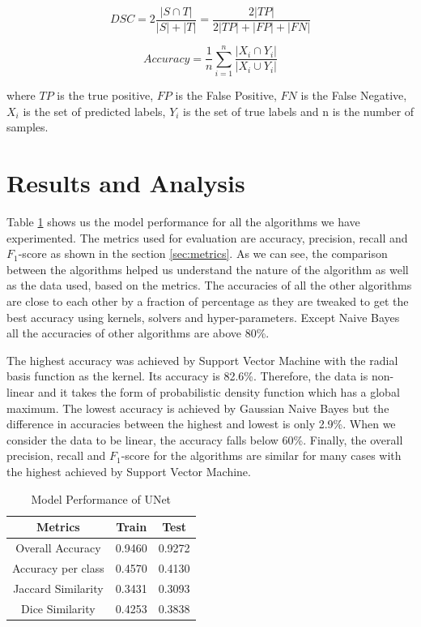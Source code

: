 \documentclass[conference]{IEEEtran}
\begin{document}
\begin{equation}
DSC = 2\frac{|S \cap T|}{|S| + |T|} = \frac{2|TP|}{2|TP| + |FP| + |FN|}
\end{equation}

\begin{equation}
Accuracy = \frac{1}{n}\sum\limits_{i=1}^{n} \frac{|X_i \cap Y_i|}{|X_i \cup Y_i|}
\end{equation}

where $TP$ is the true positive, $FP$ is the False Positive, $FN$ is the False Negative, $X_i$ is the set of predicted labels, $Y_i$ is the set of true labels and n is the number of samples.

\section{Results and Analysis}
Table \ref{table:1} shows us the model performance for all the algorithms we have experimented. The metrics used for evaluation are accuracy, precision, recall and $F_1$-score as shown in the section \ref{sec:metrics}. As we can see, the comparison between the algorithms helped us understand the nature of the algorithm as well as the data used, based on the metrics. The accuracies of all the other algorithms are close to each other by a fraction of percentage as they are tweaked to get the best accuracy using kernels, solvers and hyper-parameters. Except Naive Bayes all the accuracies of other algorithms are above 80\%. 
\par
The highest accuracy was achieved by Support Vector Machine with the radial basis function as the kernel. Its accuracy is 82.6\%. Therefore, the data is non-linear and it takes the form of probabilistic density function which has a global maximum. The lowest accuracy is achieved by Gaussian Naive Bayes but the difference in accuracies between the highest and lowest is only 2.9\%. When we consider the data to be linear, the accuracy falls below 60\%. Finally, the overall precision, recall and $F_1$-score for the algorithms are similar for many cases with the highest achieved by Support Vector Machine.
\par

\begin{table}[H]
\centering
 \begin{tabular}{|c| c c|} 
 \hline
 Metrics & Train & Test\\ [0.5ex] 
 \hline
 Overall Accuracy & 0.9460 & 0.9272\\ 
 \hline
 Accuracy per class & 0.4570 & 0.4130\\
 \hline
 Jaccard Similarity & 0.3431 & 0.3093\\
 \hline
 Dice Similarity & 0.4253 & 0.3838\\
 \hline
\end{tabular}
\vspace*{0.25cm}
\caption{Model Performance of UNet}
\label{table:1}
\end{table}
\end{document}
